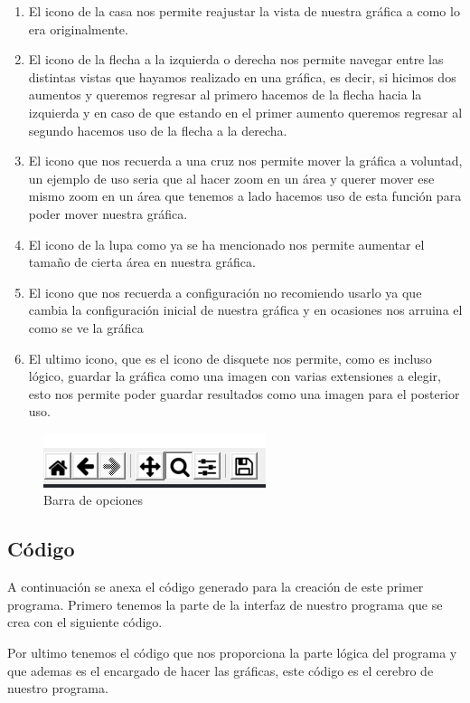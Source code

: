 \documentclass[11pt]{article}
\begin{document}
		\begin{enumerate}
		  \item El icono de la casa nos permite reajustar la vista de nuestra gráfica a como lo era originalmente.
		  \item El icono de la flecha a la izquierda o derecha nos permite navegar entre las distintas vistas que hayamos realizado en una gráfica, es decir, si hicimos dos aumentos y queremos regresar al primero hacemos de la flecha hacia la izquierda y en caso de que estando en el primer aumento queremos regresar al segundo hacemos uso de la flecha a la derecha.
		  \item El icono que nos recuerda a una cruz nos permite mover la gráfica a voluntad, un ejemplo de uso seria que al hacer zoom en un área y querer mover ese mismo zoom en un área que tenemos a lado hacemos uso de esta función para poder mover nuestra gráfica.
		  \item El icono de la lupa como ya se ha mencionado nos permite aumentar el tamaño de cierta área en nuestra gráfica.
		  \item El icono que nos recuerda a configuración no recomiendo usarlo ya que cambia la configuración inicial de nuestra gráfica y en ocasiones nos arruina el como se ve la gráfica
		  \item El ultimo icono, que es el icono de disquete nos permite, como es incluso lógico, guardar la gráfica como una imagen con varias extensiones a elegir, esto nos permite poder guardar resultados como una imagen para el posterior uso.
		\end{enumerate}
		\begin{figure}[H]
			\centering
			\includegraphics[scale=1]{resources/barra.png}
			\caption{Barra de opciones}\label{fig:picture}
		\end{figure}
		\newpage
		\subsection{Código}
	A continuación se anexa el código generado para la creación de este primer programa. Primero
tenemos la parte de la interfaz de nuestro programa que se crea con el siguiente código.
\par
	Por ultimo tenemos el código que nos proporciona la parte lógica del programa y que ademas es el encargado de hacer las gráficas, este código es el cerebro de nuestro programa.
	
\end{document}
